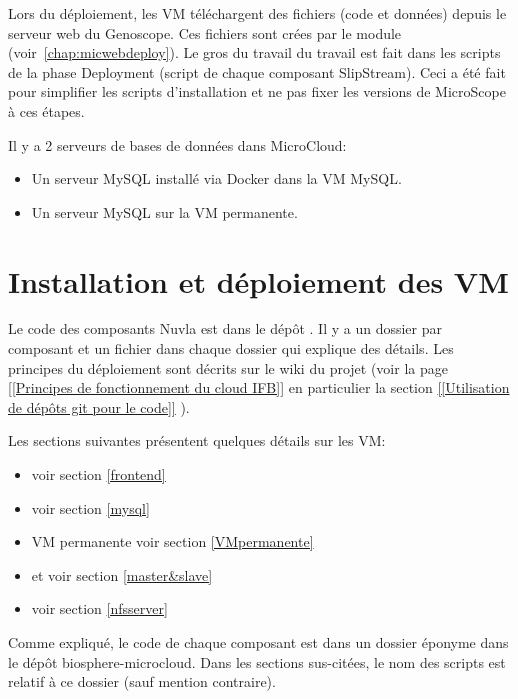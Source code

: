 Lors du déploiement, les VM téléchargent des fichiers (code et données) depuis le serveur web du Genoscope.
Ces fichiers sont crées par le module \micWEBdeployVer{} (voir~\autoref{chap:micwebdeploy}).
Le gros du travail du travail est fait dans les scripts de la phase Deployment (script  de chaque composant SlipStream).
Ceci a été fait pour simplifier les scripts d'installation et ne pas fixer les versions de MicroScope à ces étapes.

Il y a 2 serveurs de bases de données dans MicroCloud:
\begin{itemize}
    \item Un serveur MySQL installé via Docker dans la VM MySQL.
    \item Un serveur MySQL sur la VM permanente.
\end{itemize}

\section {Installation et déploiement des VM}

Le code des composants Nuvla est dans le dépôt .
Il y a un dossier par composant et un fichier  dans chaque dossier qui explique des détails.
Les principes du déploiement sont décrits sur le wiki du projet (voir la page
\href{https://intranet.genoscope.cns.fr/agc/redmine/projects/microcloud/wiki/Principes_de_fonctionnement_du_cloud_IFB}
{[[Principes de fonctionnement du cloud IFB]]}
en particulier la section
\href{https://intranet.genoscope.cns.fr/agc/redmine/projects/microcloud/wiki/Principes_de_fonctionnement_du_cloud_IFB#Utilisation-de-deacutepocircts-git-pour-le-code}
{[[Utilisation de dépôts git pour le code]]}
).

Les sections suivantes présentent quelques détails sur les VM:
\begin{itemize}
    \item {} voir section \ref{frontend}
    \item {} voir section \ref{mysql}
    \item VM permanente voir section \ref{VMpermanente}
    \item {} et  voir section \ref{master&slave}
    \item {} voir section \ref{nfsserver}
\end{itemize}
Comme expliqué, le code de chaque composant est dans un dossier éponyme dans le dépôt biosphere-microcloud.
Dans les sections sus-citées, le nom des scripts est relatif à ce dossier (sauf mention contraire).

